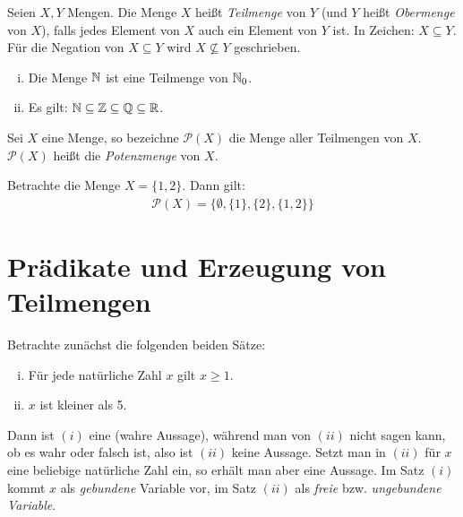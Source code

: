 \begin{mydef}
    Seien $X,Y$ Mengen. Die Menge $X$ heißt \textit{Teilmenge} von $Y$ (und $Y$ heißt \textit{Obermenge} von $X$), 
    falls jedes Element von $X$ auch ein Element von $Y$ ist. In Zeichen: $X \subseteq Y$. Für die  Negation von $X \subseteq Y$ wird 
    $X \nsubseteq Y$ geschrieben. 
\end{mydef}

\begin{example}
    \begin{enumerate}[(i)]
        \item 
        Die Menge $\mathbb{N}$ ist eine Teilmenge von $\mathbb{N}_0$. 
        \item 
        Es gilt: $\mathbb{N} \subseteq \mathbb{Z} \subseteq \mathbb{Q} \subseteq \mathbb{R}$. 
    \end{enumerate}
\end{example}

\begin{mydef}
    Sei $X$ eine Menge, so bezeichne  $\mathcal{P}(X)$ die Menge aller Teilmengen von $X$. 
    $\mathcal{P}(X)$ heißt die \textit{Potenzmenge} von $X$. 
\end{mydef}

\begin{example}
    Betrachte die Menge $X = \{1,2\}$. Dann gilt: 
    \begin{align*}
        \mathcal{P}(X) = \{\emptyset, \{1\}, \{2\}, \{1,2\}\}
    \end{align*}
\end{example}


\section{Prädikate und Erzeugung von Teilmengen}

Betrachte zunächst die folgenden beiden Sätze: 
\begin{enumerate}[(i)]
    \item 
    Für jede natürliche Zahl $x$ gilt $x \geq 1$. 
    \item 
    $x$ ist kleiner als 5.
\end{enumerate}

Dann ist $(i)$ eine (wahre Aussage), während man von $(ii)$ nicht sagen kann, ob es wahr oder falsch ist, also ist $(ii)$ keine Aussage. 
Setzt man in $(ii)$ für $x$ eine beliebige natürliche Zahl ein, so erhält man aber eine Aussage. Im Satz $(i)$ kommt $x$ als \textit{gebundene} Variable vor, 
im Satz $(ii)$ als \textit{freie} bzw. \textit{ungebundene Variable}. 

